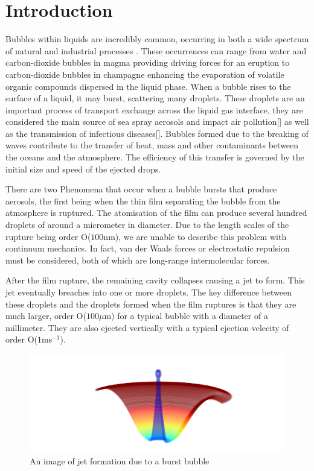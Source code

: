 \section{Introduction}

Bubbles within liquids are incredibly common, occurring in both a wide spectrum of natural and industrial processes \cite{Volcano,bird2010daughter,deike2022mass,dollet2019bubble,feng2014nanoemulsions,oratis2020new,veron2015ocean,WINE}. These occurrences can range from water and carbon-dioxide bubbles in magma providing driving forces for an eruption \cite{Volcano} to carbon-dioxide bubbles in champagne enhancing the evaporation of volatile organic compounds dispersed in the liquid phase. When a bubble rises to the surface of a liquid, it may burst, scattering many droplets. These droplets are an important process of transport exchange across the liquid gas interface\cite{notdoneyet}, they are considered the main source of sea spray aerosols and impact air pollution[] as well as the transmission of infectious diseases[]. Bubbles formed due to the breaking of waves contribute to the transfer of heat, mass and other contaminants between the oceans and the atmosphere. The efficiency of this transfer is governed by the initial size and speed of the ejected drops.

There are two Phenomena that occur when a bubble bursts that produce aerosols, the first being when the thin film separating the bubble from the atmosphere is ruptured. The atomisation of the film can produce several hundred droplets of around a micrometer in diameter. Due to the length scales of the rupture being order O($100$nm), we are unable to describe this problem with continuum mechanics. In fact, van der Waals forces or electrostatic repulsion must be considered, both of which are long-range intermolecular forces.

After the film rupture, the remaining cavity collapses causing a jet to form. This jet eventually breaches into one or more droplets. The key difference between these droplets and the droplets formed when the film ruptures is that they are much larger, order O($100 \mu$m) for a typical bubble with a diameter of a millimeter. They are also ejected vertically with a typical ejection velecity of order O($1$ms$^{-1}$).
\begin{figure}[H]
    \centering
    \includegraphics[width=0.75\linewidth]{WriteUp/images/droplet release 3D.png}
    \caption{An image of jet formation due to a burst bubble}
    \label{fig:1}
\end{figure}

